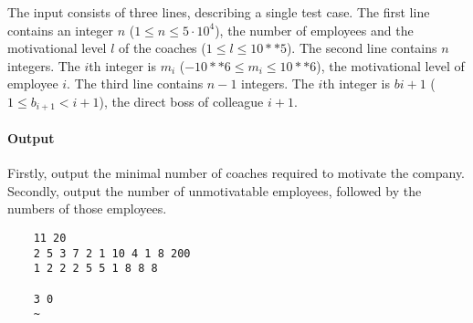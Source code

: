The input consists of three lines, describing a single test case.
The first line contains an integer $n$ ($1 \leq n \leq 5 \cdot 10^4$), the number of employees and the motivational level $l$ of the coaches ($1 \leq l \leq 10**5$).
The second line contains $n$ integers. The $i$th integer is $m_i$ ($-10**6 \leq m_i \leq 10**6$), the motivational level of employee $i$.
The third line contains $n - 1$ integers. The $i$th integer is $bi+1$ ($1 \leq b_{i+1} < i + 1$), the direct boss of colleague $i + 1$.

\paragraph*{Output}

Firstly, output the minimal number of coaches required to motivate the company.
Secondly, output the number of unmotivatable employees, followed by the numbers of those employees.


\begin{samples}
  \begin{verbatim}
    11 20
    2 5 3 7 2 1 10 4 1 8 200
    1 2 2 2 5 5 1 8 8 8

    3 0
    ~
  \end{verbatim}
\end{samples}


